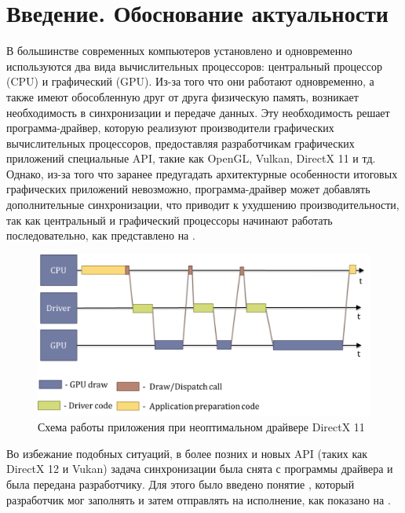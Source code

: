 \chapter*{Введение. Обоснование актуальности} %

В большинстве современных компьютеров установлено и одновременно используются два вида вычислительных процессоров: центральный процессор (CPU) и графический (GPU). Из-за того что они работают одновременно, а также имеют обособленную друг от друга физическую память, возникает необходимость в синхронизации и передаче данных. Эту необходимость решает программа-драйвер, которую реализуют производители графических вычислительных процессоров, предоставляя разработчикам графических приложений специальные API, такие как OpenGL, Vulkan, DirectX 11 и тд. Однако, из-за того что заранее предугадать архитектурные особенности итоговых графических приложений невозможно, программа-драйвер может добавлять дополнительные синхронизации, что приводит к ухудшению производительности, так как центральный и графический процессоры начинают работать последовательно, как представлено на .

\begin{figure}[ht!] 
	\center
	\includegraphics [scale=0.23] {my_folder/images//pipeline_dx11}
	\caption{Схема работы приложения при неоптимальном драйвере DirectX 11} 
	\label{fig:pipeline_dx11}  
\end{figure}

Во избежание подобных ситуаций, в более позних и новых API (таких как DirectX 12 и Vukan) задача синхронизации была снята с программы драйвера и была передана разработчику. Для этого было введено понятие , который разработчик мог заполнять и затем отправлять на исполнение, как показано на .

